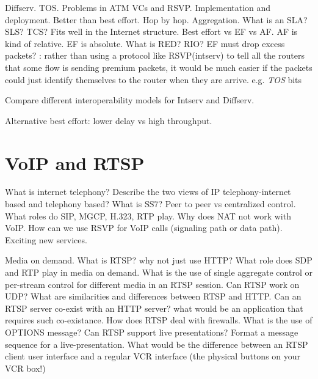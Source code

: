 \documentclass{myart}
\begin{document}
\w Diffserv. TOS. Problems in ATM VCs and RSVP. Implementation and
deployment.  Better than best effort. Hop by hop. Aggregation. What is
an SLA? SLS? TCS?  Fits well in the Internet structure. Best effort vs
EF vs AF. AF is kind of relative. EF is absolute. What is RED? RIO? EF
must drop excess packets?
	\bit
	\w {}: rather than using a protocol like RSVP(intserv) 
	to tell all the routers that some flow is sending premium packets, it
would be much easier if the packets could just identify themselves to the
router when they are arrive. e.g. {\em TOS} bits
	
	\eit

\w Compare different interoperability models for Intserv and Diffserv.

\w Alternative best effort: lower delay vs high throughput.

\een

\section*{VoIP and RTSP}
\ben
\w What is internet telephony? Describe the two views of IP
telephony-internet based and telephony based? What is SS7? Peer to
peer vs centralized control. What roles do SIP, MGCP, H.323, RTP
play. Why does NAT not work with VoIP. How can we use RSVP for VoIP
calls (signaling path or data path). Exciting new services.

\w Media on demand. What is RTSP? why not just use HTTP? What role
does SDP and RTP play in media on demand. What is the use of single
aggregate control or per-stream control for different media in an RTSP
session. Can RTSP work on UDP? What are similarities and differences
between RTSP and HTTP. Can an RTSP server co-exist with an HTTP
server? what would be an application that requires such
co-existance. How does RTSP deal with firewalls. What is the use of
OPTIONS message? Can RTSP support live presentations? Format a message
sequence for a live-presentation. What would be the difference between
an RTSP client user interface and a regular VCR interface (the
physical buttons on your VCR box!)

\een

\end{document}
